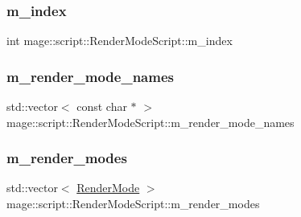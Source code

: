 \hypertarget{classmage_1_1script_1_1_render_mode_script_a7c18b69323011be23a3ff6148b519619}{}\label{classmage_1_1script_1_1_render_mode_script_a7c18b69323011be23a3ff6148b519619} 
\subsubsection{\texorpdfstring{m\+\_\+index}{m\_index}}
{\footnotesize\ttfamily int mage\+::script\+::\+Render\+Mode\+Script\+::m\+\_\+index\hspace{0.3cm}{\ttfamily [private]}}

\hypertarget{classmage_1_1script_1_1_render_mode_script_a5e83e8a5b6a2ab495b7ede9440520d1b}{}\label{classmage_1_1script_1_1_render_mode_script_a5e83e8a5b6a2ab495b7ede9440520d1b} 
\subsubsection{\texorpdfstring{m\+\_\+render\+\_\+mode\+\_\+names}{m\_render\_mode\_names}}
{\footnotesize\ttfamily std\+::vector$<$ const char $\ast$ $>$ mage\+::script\+::\+Render\+Mode\+Script\+::m\+\_\+render\+\_\+mode\+\_\+names\hspace{0.3cm}{\ttfamily [private]}}

\hypertarget{classmage_1_1script_1_1_render_mode_script_ae00c640a9881be6e4e238c3451236a52}{}\label{classmage_1_1script_1_1_render_mode_script_ae00c640a9881be6e4e238c3451236a52} 
\subsubsection{\texorpdfstring{m\+\_\+render\+\_\+modes}{m\_render\_modes}}
{\footnotesize\ttfamily std\+::vector$<$ \hyperlink{namespacemage_a5e7e18b0154373ce8fc942fe3f6b27fd}{Render\+Mode} $>$ mage\+::script\+::\+Render\+Mode\+Script\+::m\+\_\+render\+\_\+modes\hspace{0.3cm}{\ttfamily [private]}}

